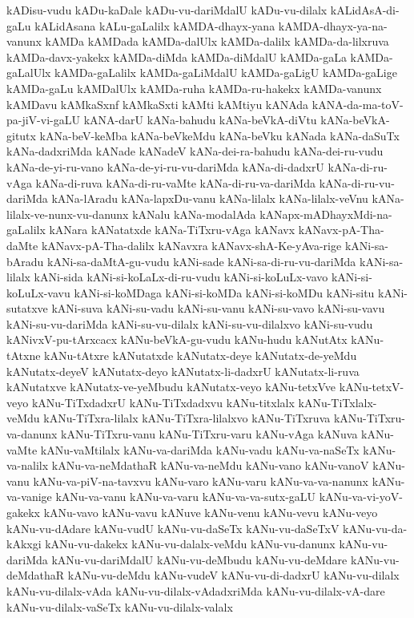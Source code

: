 {kADisu-vudu
kADu-kaDale
kADu-vu-dariMdalU
kADu-vu-dilalx
kALidAsA-di-gaLu
kALidAsana
kALu-gaLalilx
kAMDA-dhayx-yana
kAMDA-dhayx-ya-na-vanunx
kAMDa
kAMDada
kAMDa-dalUlx
kAMDa-dalilx
kAMDa-da-lilxruva
kAMDa-davx-yakekx
kAMDa-diMda
kAMDa-diMdalU
kAMDa-gaLa
kAMDa-gaLalUlx
kAMDa-gaLalilx
kAMDa-gaLiMdalU
kAMDa-gaLigU
kAMDa-gaLige
kAMDa-gaLu
kAMDalUlx
kAMDa-ruha
kAMDa-ru-hakekx
kAMDa-vanunx
kAMDavu
kAMkaSxnf
kAMkaSxti
kAMti
kAMtiyu
kANAda
kANA-da-ma-toV-pa-jiV-vi-gaLU
kANA-darU
kANa-bahudu
kANa-beVkA-diVtu
kANa-beVkA-gitutx
kANa-beV-keMba
kANa-beVkeMdu
kANa-beVku
kANada
kANa-daSuTx
kANa-dadxriMda
kANade
kANadeV
kANa-dei-ra-bahudu
kANa-dei-ru-vudu
kANa-de-yi-ru-vano
kANa-de-yi-ru-vu-dariMda
kANa-di-dadxrU
kANa-di-ru-vAga
kANa-di-ruva
kANa-di-ru-vaMte
kANa-di-ru-va-dariMda
kANa-di-ru-vu-dariMda
kANa-lAradu
kANa-lapxDu-vanu
kANa-lilalx
kANa-lilalx-veVnu
kANa-lilalx-ve-nunx-vu-danunx
kANalu
kANa-modalAda
kANapx-mADhayxMdi-na-gaLalilx
kANara
kANatatxde
kANa-TiTxru-vAga
kANavx
kANavx-pA-Tha-daMte
kANavx-pA-Tha-dalilx
kANavxra
kANavx-shA-Ke-yAva-rige
kANi-sa-bAradu
kANi-sa-daMtA-gu-vudu
kANi-sade
kANi-sa-di-ru-vu-dariMda
kANi-sa-lilalx
kANi-sida
kANi-si-koLaLx-di-ru-vudu
kANi-si-koLuLx-vavo
kANi-si-koLuLx-vavu
kANi-si-koMDaga
kANi-si-koMDa
kANi-si-koMDu
kANi-situ
kANi-sutatxve
kANi-suva
kANi-su-vadu
kANi-su-vanu
kANi-su-vavo
kANi-su-vavu
kANi-su-vu-dariMda
kANi-su-vu-dilalx
kANi-su-vu-dilalxvo
kANi-su-vudu
kANivxV-pu-tArxcacx
kANu-beVkA-gu-vudu
kANu-hudu
kANutAtx
kANu-tAtxne
kANu-tAtxre
kANutatxde
kANutatx-deye
kANutatx-de-yeMdu
kANutatx-deyeV
kANutatx-deyo
kANutatx-li-dadxrU
kANutatx-li-ruva
kANutatxve
kANutatx-ve-yeMbudu
kANutatx-veyo
kANu-tetxVve
kANu-tetxV-veyo
kANu-TiTxdadxrU
kANu-TiTxdadxvu
kANu-titxlalx
kANu-TiTxlalx-veMdu
kANu-TiTxra-lilalx
kANu-TiTxra-lilalxvo
kANu-TiTxruva
kANu-TiTxru-va-danunx
kANu-TiTxru-vanu
kANu-TiTxru-varu
kANu-vAga
kANuva
kANu-vaMte
kANu-vaMtilalx
kANu-va-dariMda
kANu-vadu
kANu-va-naSeTx
kANu-va-nalilx
kANu-va-neMdathaR
kANu-va-neMdu
kANu-vano
kANu-vanoV
kANu-vanu
kANu-va-piV-na-tavxvu
kANu-varo
kANu-varu
kANu-va-va-nanunx
kANu-va-vanige
kANu-va-vanu
kANu-va-varu
kANu-va-va-sutx-gaLU
kANu-va-vi-yoV-gakekx
kANu-vavo
kANu-vavu
kANuve
kANu-venu
kANu-vevu
kANu-veyo
kANu-vu-dAdare
kANu-vudU
kANu-vu-daSeTx
kANu-vu-daSeTxV
kANu-vu-da-kAkxgi
kANu-vu-dakekx
kANu-vu-dalalx-veMdu
kANu-vu-danunx
kANu-vu-dariMda
kANu-vu-dariMdalU
kANu-vu-deMbudu
kANu-vu-deMdare
kANu-vu-deMdathaR
kANu-vu-deMdu
kANu-vudeV
kANu-vu-di-dadxrU
kANu-vu-dilalx
kANu-vu-dilalx-vAda
kANu-vu-dilalx-vAdadxriMda
kANu-vu-dilalx-vA-dare
kANu-vu-dilalx-vaSeTx
kANu-vu-dilalx-valalx
}
